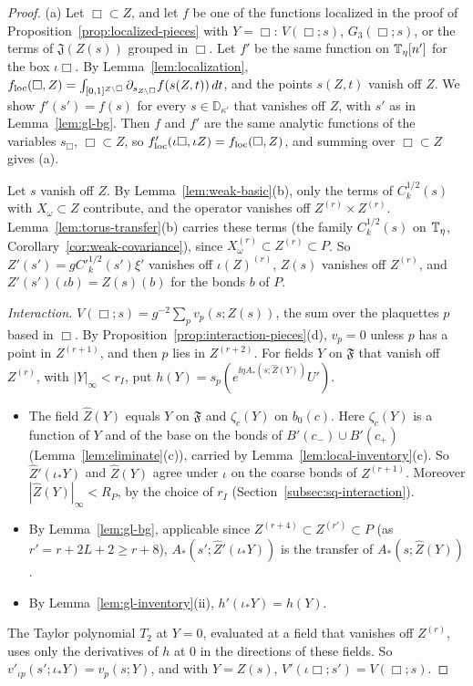 \begin{proof}
(a) Let $\Box\subset Z$, and let $f$ be one of the functions localized in the proof of Proposition~\ref{prop:localized-pieces} with $Y=\Box$: $V(\Box;s)$, $G_3(\Box;s)$, or the terms of $\mathfrak J(Z(s))$ grouped in $\Box$. Let $f'$ be the same function on $\mathbb T_\eta[n']$ for the box $\iota\Box$. By Lemma~\ref{lem:localization}, $f_{\rm loc}(\Box,Z)=\int_{[0,1]^{Z\setminus\Box}}\partial_{s_{Z\setminus\Box}}f(s(Z,t))\,dt$, and the points $s(Z,t)$ vanish off $Z$. We show $f'(s')=f(s)$ for every $s\in\mathbb D_{\kappa'}$ that vanishes off $Z$, with $s'$ as in Lemma~\ref{lem:gl-bg}. Then $f$ and $f'$ are the same analytic functions of the variables $s_\Box$, $\Box\subset Z$, so $f'_{\rm loc}(\iota\Box,\iota Z)=f_{\rm loc}(\Box,Z)$, and summing over $\Box\subset Z$ gives (a).

Let $s$ vanish off $Z$. By Lemma~\ref{lem:weak-basic}(b), only the terms of $C_k^{1/2}(s)$ with $X_\omega\subset Z$ contribute, and the operator vanishes off $Z^{(r)}\times Z^{(r)}$. Lemma~\ref{lem:torus-transfer}(b) carries these terms (the family $C_k^{1/2}(s)$ on $\mathbb T_\eta$, Corollary~\ref{cor:weak-covariance}), since $X_\omega^{(r)}\subset Z^{(r)}\subset P$. So $Z'(s')=gC'^{1/2}_k(s')\xi'$ vanishes off $\iota(Z)^{(r)}$, $Z(s)$ vanishes off $Z^{(r)}$, and $Z'(s')(\iota b)=Z(s)(b)$ for the bonds $b$ of $P$.

\emph{Interaction.} $V(\Box;s)=g^{-2}\sum_pv_p(s;Z(s))$, the sum over the plaquettes $p$ based in $\Box$. By Proposition~\ref{prop:interaction-pieces}(d), $v_p=0$ unless $p$ has a point in $Z^{(r+1)}$, and then $p$ lies in $Z^{(r+2)}$. For fields $Y$ on $\mathfrak F$ that vanish off $Z^{(r)}$, with $|Y|_\infty<r_I$, put $h(Y)=s_p(e^{\ii\eta A_*(s;\hat Z(Y))}U')$.
\begin{itemize}
\item The field $\hat Z(Y)$ equals $Y$ on $\mathfrak F$ and $\zeta_c(Y)$ on $b_0(c)$. Here $\zeta_c(Y)$ is a function of $Y$ and of the base on the bonds of $B'(c_-)\cup B'(c_+)$ (Lemma~\ref{lem:eliminate}(c)), carried by Lemma~\ref{lem:local-inventory}(c). So $\hat Z'(\iota_*Y)$ and $\hat Z(Y)$ agree under $\iota$ on the coarse bonds of $Z^{(r+1)}$. Moreover $|\hat Z(Y)|_\infty<R_P$, by the choice of $r_I$ (Section~\ref{subsec:sq-interaction}).
\item By Lemma~\ref{lem:gl-bg}, applicable since $Z^{(r+4)}\subset Z^{(r')}\subset P$ (as $r'=r+2L+2\ge r+8$), $A_*(s';\hat Z'(\iota_*Y))$ is the transfer of $A_*(s;\hat Z(Y))$.
\item By Lemma~\ref{lem:gl-inventory}(ii), $h'(\iota_*Y)=h(Y)$.
\end{itemize}
The Taylor polynomial $T_2$ at $Y=0$, evaluated at a field that vanishes off $Z^{(r)}$, uses only the derivatives of $h$ at $0$ in the directions of these fields. So $v'_{\iota p}(s';\iota_*Y)=v_p(s;Y)$, and with $Y=Z(s)$, $V'(\iota\Box;s')=V(\Box;s)$.


\end{proof}
